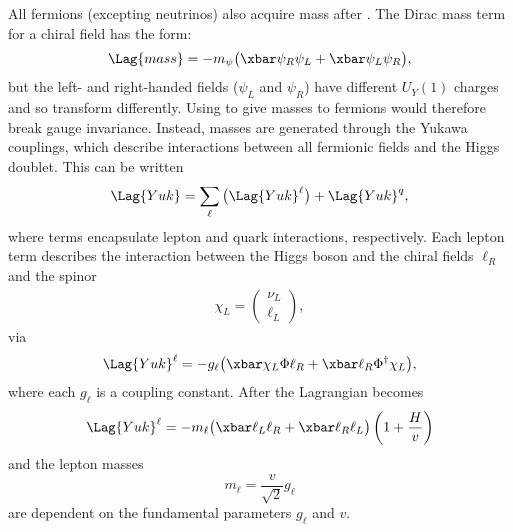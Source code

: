 All fermions (excepting neutrinos) also acquire mass after \SSB.
The Dirac mass term for a chiral field has the form:
\begin{equation}
  \Lag{mass} = -m_\psi\big(\xbar\psi_R\psi_L + \xbar\psi_L\psi_R\big),
  \label{eq:diracmass}
\end{equation}
but the left- and right-handed fields
($\psi_L$ and $\psi_R$) have different $U_Y(1)$ charges and so transform differently.
Using  to give masses to fermions would therefore break gauge invariance.
Instead, masses are generated through the Yukawa couplings, which
describe interactions between all fermionic fields and the Higgs doublet.
This can be written
\begin{equation}
  \Lag{Yuk} = \sum_{\ell}\big(\Lag{Yuk}^\ell\big) + \Lag{Yuk}^q,
  \label{eq:th:yukking}
\end{equation}
where terms encapsulate lepton and quark interactions, respectively.
Each lepton term describes the interaction between the Higgs boson and the chiral fields
$\ell_R$ and the spinor
\begin{align}
  \chi_L = \begin{pmatrix}\nu_L \\ \ell_L \end{pmatrix},
\end{align}
via
\begin{equation}
  \Lag{Yuk}^\ell
  = - g_\ell\big(\xbar\chi_L\Phi \ell_R + \xbar \ell_R\Phi^\dagger\chi_L\big),
\end{equation}
where each $g_\ell$ is a coupling constant.
After \SSB the Lagrangian becomes
\begin{align}
  \Lag{Yuk}^\ell
  = - m_\ell \big(\xbar\ell_L\ell_R + \xbar\ell_R\ell_L\big)%
  \left(1 + \frac{H}{v}\right)
\end{align}
and the  lepton masses
\begin{equation}
  m_\ell = \frac{v}{\sqrt{2}}g_\ell
  \label{eq:leptonmass}
\end{equation}
are dependent on the fundamental parameters $g_\ell$ and $v$.

